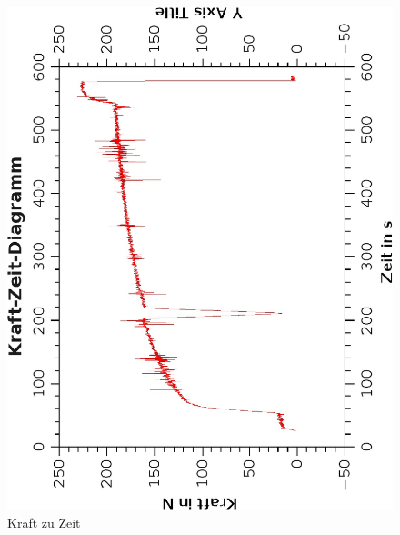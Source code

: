 \documentclass{article}
\begin{document}
\begin{center}
\begin{figure}	
\caption{Kraft zu Zeit}
\includegraphics[scale=0.8, angle=-90]{kraftzeitkurve.eps}
\end{figure}
\end{center}
\end{document}
